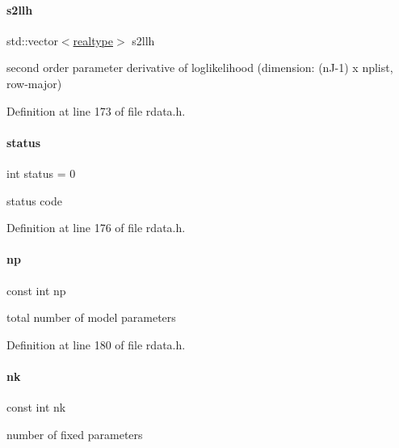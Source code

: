 \paragraph{\texorpdfstring{s2llh}{s2llh}}
{\footnotesize\ttfamily std\+::vector$<$\mbox{\hyperlink{namespaceamici_a1bdce28051d6a53868f7ccbf5f2c14a3}{realtype}}$>$ s2llh}

second order parameter derivative of loglikelihood (dimension\+: (n\+J-\/1) x nplist, row-\/major) 

Definition at line 173 of file rdata.\+h.

\mbox{\label{classamici_1_1_return_data_a6e27f49150e9a14580fb313cc2777e00}} 
\paragraph{\texorpdfstring{status}{status}}
{\footnotesize\ttfamily int status = 0}

status code 

Definition at line 176 of file rdata.\+h.

\mbox{\label{classamici_1_1_return_data_a72e833f8ef129cac553feb1167223bc3}} 
\paragraph{\texorpdfstring{np}{np}}
{\footnotesize\ttfamily const int np}

total number of model parameters 

Definition at line 180 of file rdata.\+h.

\mbox{\label{classamici_1_1_return_data_a5e273eaccc1df0343f5a1d4d136f2f2c}} 
\paragraph{\texorpdfstring{nk}{nk}}
{\footnotesize\ttfamily const int nk}

number of fixed parameters 

